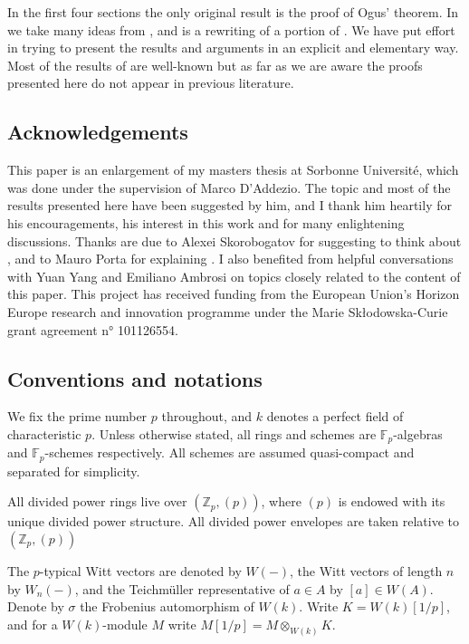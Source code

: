 \documentclass[11pt]{article}
\theoremstyle{plain}
\theoremstyle{definition}
\theoremstyle{remark}
\numberwithin{equation}{section}
\newcommand{\Fp}{\mathbb{F}_p}
\newcommand{\Zp}{\mathbb{Z}_p}
\newcommand{\W}{W}                                                       %
\newcommand{\K}{K}
\begin{document}
In the first four sections the only original result is the proof of Ogus' theorem. In  we take many ideas from \cite{drinfeldacris}, and  is a rewriting of a portion of \cite[Section 7]{bhattlurie}. We have put effort in trying to present the results and arguments in an explicit and elementary way. Most of the results of  are well-known but as far as we are aware the proofs presented here do not appear in previous literature.

\subsection*{Acknowledgements} This paper is an enlargement of my masters thesis at Sorbonne Université, which was done under the supervision of Marco D'Addezio. The topic and most of the results presented here have been suggested by him, and I thank him heartily for his encouragements, his interest in this work and for many enlightening discussions. Thanks are due to Alexei Skorobogatov for suggesting to think about , and to Mauro Porta for explaining . I also benefited from helpful conversations with Yuan Yang and Emiliano Ambrosi on topics closely related to the content  of this paper. This project has received funding from the European Union’s Horizon Europe research
and innovation programme under the Marie Skłodowska-Curie grant agreement n° 101126554.

\subsection*{Conventions and notations}
We fix the prime number $p$ throughout, and $k$ denotes a perfect field of characteristic $p$. Unless otherwise stated, all rings and schemes are $\Fp$-algebras and $\Fp$-schemes respectively. All schemes are assumed quasi-compact and separated for simplicity. 

All divided power rings live over $(\Zp,(p))$, where $(p)$ is endowed with its unique divided power structure. All divided power envelopes are taken relative to $(\Zp,(p))$ 

The $p$-typical Witt vectors are denoted by $\W(-)$, the Witt vectors of length $n$ by $W_n(-)$, and the Teichmüller representative of $a\in A$ by $[a]\in\W(A)$. Denote by $\sigma$ the Frobenius automorphism of $\W(k)$. Write $\K=\W(k)[1/p]$, and for a $\W(k)$-module $M$ write $M[1/p]=M\otimes_{\W(k)}\K$.
\end{document}
